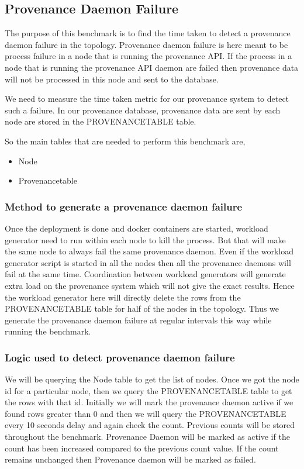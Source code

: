 \subsection{Provenance Daemon Failure}

The purpose of this benchmark is to find the time taken to detect a provenance daemon failure in the topology. Provenance daemon failure is here meant to be process failure in a node that is running the provenance API. If the process in a node that is running the provenance API daemon are failed then provenance data will not be processed in this node and sent to the database.

We need to measure the time taken metric for our provenance system to detect such a failure. In our provenance database, provenance data are sent by each node are stored in the PROVENANCETABLE table.

So the main tables that are needed to perform this benchmark are,
    \begin{itemize}
        \item Node
        \item Provenancetable
    \end{itemize}

\subsubsection{Method to generate a provenance daemon failure}

Once the deployment is done and docker containers are started, workload generator need to run within each node to kill the process. But that will make the same node to always fail the same provenance daemon. Even if the workload generator script is started in all the nodes then all the provenance daemons will fail at the same time. Coordination between workload generators will generate extra load on the provenance system which will not give the exact results. Hence the workload generator here will directly delete the rows from the PROVENANCETABLE table for half of the nodes in the topology. Thus we generate the provenance daemon failure at regular intervals this way while running the benchmark.

\subsubsection{Logic used to detect provenance daemon failure}

We will be querying the Node table to get the list of nodes. Once we got the node id for a particular node, then we query the PROVENANCETABLE table to get the rows with that id. Initially we will mark the provenance daemon active if we found rows greater than 0 and then we will query the PROVENANCETABLE every 10 seconds delay and again check the count. Previous counts will be stored throughout the benchmark. Provenance Daemon will be marked as active if the count has been increased compared to the previous count value. If the count remains unchanged then Provenance daemon will be marked as failed.

